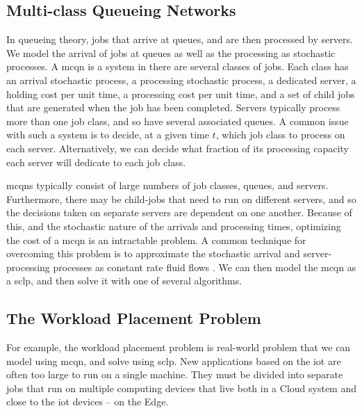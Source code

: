 \documentclass[11pt,a4paper,titlepage]{article}
\theoremstyle{definition}
\theoremstyle{plain}
\begin{document}
    \subsection{Multi-class Queueing Networks}
    \label{subsec:theory:mcqn}

    In queueing theory,
    jobs that arrive at queues,
    and are then processed by servers.
    We model the arrival of jobs at queues as well as the processing
    as stochastic processes.
    A \Gls{mcqn} is a system in there are several classes of jobs.
    Each class has an arrival stochastic process,
    a processing stochastic process,
    a dedicated server,
    a holding cost per unit time,
    a processing cost per unit time,
    and a set of child jobs that are generated when the job has been completed.
    Servers typically process more than one job class,
    and so have several associated queues.
    A common issue with such a system is to decide,
    at a given time $t$,
    which job class to process on each server.
    Alternatively,
    we can decide what fraction of its processing capacity each server will dedicate to
    each job class.


    \Glspl{mcqn} typically consist of large numbers of job classes,
    queues,
    and servers.
    Furthermore,
    there may be child-jobs that need to run on different servers,
    and so the decisions taken on separate servers are dependent on one another.
    Because of this,
    and the stochastic nature of the arrivals and processing times,
    optimizing the cost of a \gls{mcqn} is an intractable problem.
    A common technique for overcoming this problem is
    to approximate the stochastic arrival and server-processing processes
    as constant rate fluid flows \autocite{weiss1999scheduling}.
    We can then model the \gls{mcqn} as a \Gls{sclp},
    and then solve it with one of several algorithms.

    \subsection{The Workload Placement Problem}
    \label{subsec:theory:workload-placement}

    For example,
    the workload placement problem is real-world problem that we can model using \gls{mcqn},
    and solve using \gls{sclp}.
    New applications based on the \gls{iot} are often too large to run on a single machine.
    They must be divided into separate jobs that run on multiple computing devices that live both in a Cloud system and close to the \gls{iot} devices -- on the Edge.
\end{document}
